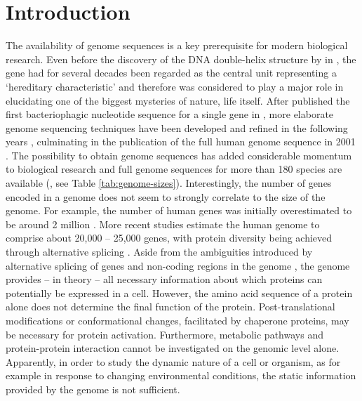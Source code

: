 \chapter{Introduction}

The availability of genome sequences is a key prerequisite for modern 
biological research.
Even before the discovery of the DNA double-helix structure by 
\citeauthor{Watson1953} in \citeyear{Watson1953}, the gene had for several 
decades been regarded as the central unit representing a 
`hereditary characteristic' \citep{Vries1889} and therefore was considered
to play a major role in elucidating one of the biggest mysteries of nature, 
life itself.
After \citeauthor{Jou1972} published the first bacteriophagic nucleotide 
sequence for a single gene in \citeyear{Jou1972}, more elaborate genome 
sequencing techniques have been developed and refined in the following years
\citep{Gilbert1973, Sanger1975, Maxam1977}, culminating in the publication of 
the full human genome sequence in 2001 \citep{Venter2001}.
The possibility to obtain genome sequences has added considerable momentum
to biological research and full genome sequences for more than 180 species
are available (\cite{Yates2009}, see Table \ref{tab:genome-sizes}).
Interestingly, the number of genes encoded in a genome does not seem to strongly
correlate to the size of the genome.
For example, the number of human genes was initially overestimated to be around 
2 million \citep{Kauffman1969}.
More recent studies estimate the human genome to comprise about 20,000 -- 25,000 
genes, with protein diversity being achieved through alternative splicing 
\citep{Rubin2004}.
Aside from the ambiguities introduced by alternative splicing of genes 
\citep{Black2003} and non-coding regions in the genome \citep{Gilbert1978},
the genome provides -- in theory -- all necessary information about which 
proteins can potentially be expressed in a cell.
However, the amino acid sequence of a protein alone does not determine the 
final function of the protein.
Post-translational modifications or conformational changes, facilitated by
chaperone proteins, may be necessary for protein activation.
Furthermore, metabolic pathways and protein-protein interaction cannot be
investigated on the genomic level alone.
Apparently, in order to study the dynamic nature of a cell or organism, as for 
example in response to changing environmental conditions, the static information
provided by the genome is not sufficient. 

